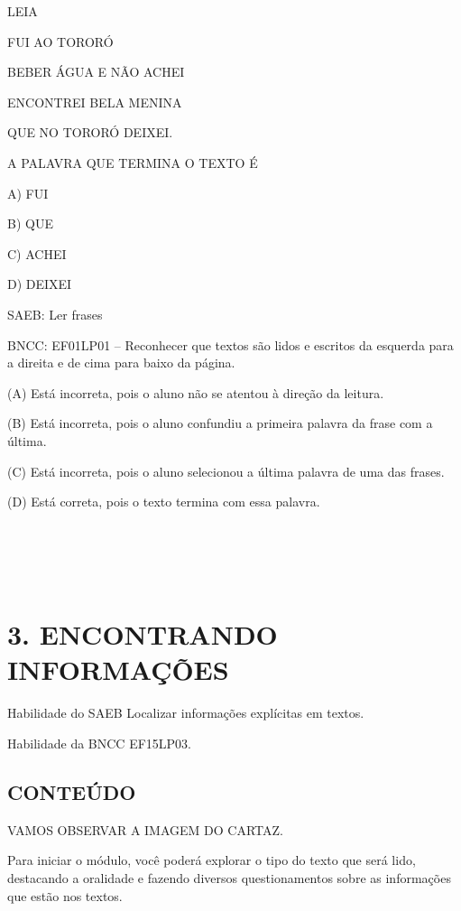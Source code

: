 LEIA

FUI AO TORORÓ

BEBER ÁGUA E NÃO ACHEI

ENCONTREI BELA MENINA

QUE NO TORORÓ DEIXEI.

A PALAVRA QUE TERMINA O TEXTO É

A) FUI

B) QUE

C) ACHEI

D) DEIXEI

SAEB: Ler frases

BNCC: EF01LP01 -- Reconhecer que textos são lidos e escritos da esquerda
para a direita e de cima para baixo da página.

(A) Está incorreta, pois o aluno não se atentou à direção da leitura.

(B) Está incorreta, pois o aluno confundiu a primeira palavra da frase com a última.

(C) Está incorreta, pois o aluno selecionou a última palavra de uma das
frases.

(D) Está correta, pois o texto termina com essa palavra.

\section{\texorpdfstring{\\
}{ }}\label{section-7}

\section{3. ENCONTRANDO
INFORMAÇÕES}\label{modulo-3-encontrando-informauxe7uxf5es}

\protect\hypertarget{_heading=h.lnxbz9}{}{}Habilidade do SAEB 
Localizar informações explícitas em textos.

Habilidade da BNCC 
EF15LP03.

\subsection{CONTEÚDO}\label{conteuxfado-2}

VAMOS OBSERVAR A IMAGEM DO CARTAZ.

\protect\hypertarget{_heading=h.35nkun2}{}{}Para iniciar o módulo, você
poderá explorar o tipo do texto que será lido, destacando a oralidade e
fazendo diversos questionamentos sobre as informações que estão nos textos.


